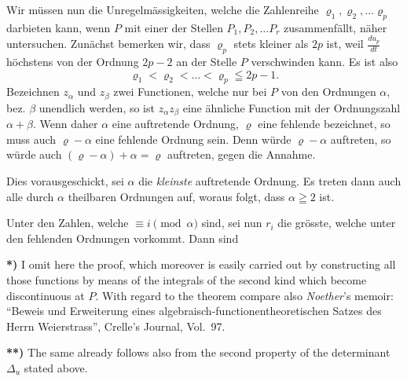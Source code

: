 \documentclass{article}
\begin{document}
Wir müssen nun die Unregelmässigkeiten, welche die Zahlenreihe $\varrho_1, \varrho_2, \dots \varrho_p$ darbieten kann, wenn $P$ mit einer der Stellen $P_1, P_2, \dots P_r$ zusammenfällt, näher untersuchen. Zunächst bemerken wir, dass $\varrho_p$ stets kleiner als $2p$ ist, weil $\frac{du_p}{dt}$ höchstens von der Ordnung $2p-2$ an der Stelle $P$ verschwinden kann. Es ist also
\[
\varrho_1 < \varrho_2 < \dots < \varrho_p \leqq 2p - 1.
\tag{6}
\]
Bezeichnen $z_\alpha$ und $z_\beta$ zwei Functionen, welche nur bei $P$ von den Ordnungen $\alpha$, bez. $\beta$ unendlich werden, so ist $z_\alpha z_\beta$ eine ähnliche Function mit der Ordnungszahl $\alpha + \beta$. Wenn daher $\alpha$ eine auftretende Ordnung, $\varrho$ eine fehlende bezeichnet, so muss auch $\varrho - \alpha$ eine fehlende Ordnung sein. Denn würde $\varrho - \alpha$ auftreten, so würde auch $(\varrho - \alpha) + \alpha = \varrho$ auftreten, gegen die Annahme.

Dies vorausgeschickt, sei $\alpha$ die \emph{kleinste} auftretende Ordnung. Es treten dann auch alle durch $\alpha$ theilbaren Ordnungen auf, woraus folgt, dass $\alpha \geqq 2$ ist.

Unter den Zahlen, welche $\equiv i \pmod \alpha$ sind, sei nun $r_i$ die grösste, welche unter den fehlenden Ordnungen vorkommt. Dann sind

\textbf{*)} I omit here the proof, which moreover is easily carried out by constructing all those functions by means of the integrals of the second kind which become discontinuous at $P$. With regard to the theorem compare also \emph{Noether}'s memoir: ``Beweis und Erweiterung eines algebraisch-functionentheoretischen Satzes des Herrn Weierstrass'', Crelle's Journal, Vol.~97.

\textbf{**)} The same already follows also from the second property of the determinant $\Delta_u$ stated above.
\end{document}
